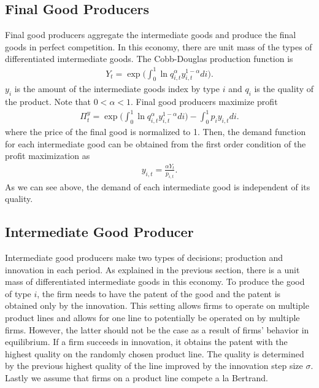 \documentclass[a4paper,12pt]{article}
\begin{document}
\subsection{Final Good Producers}
Final good producers aggregate the intermediate goods and produce the final goods in perfect competition. In this economy, there are unit mass of the types of differentiated imtermediate goods. The Cobb-Douglas production function is
\begin{align}
    Y_t = \exp\bigg(\int_0^1 \ln q_{i,t}^\alpha y_{i,t}^{1-\alpha} di\bigg).
\end{align}
$y_i$ is the amount of the intermediate goods index by type $i$ and $q_i$ is the quality of the product. Note that $0<\alpha<1$. Final good producers maximize profit 
\begin{align}
    \Pi_t^y = \exp\bigg(\int_0^1 \ln q_{i,t}^\alpha y_{i,t}^{1-\alpha} di\bigg) - \int_0^1 p_i y_{i,t} di.
\end{align}
where the price of the final good is normalized to 1. Then, the demand function for each intermediate good can be obtained from the first order condition of the profit maximization as
\begin{align}
    y_{i,t} = \frac{\alpha Y_t}{p_{i,t}}.
\end{align}
As we can see above, the demand of each intermediate good is independent of its quality. 

\subsection{Intermediate Good Producer}
Intermediate good producers make two types of decisions; production and innovation in each period. As explained in the previous section, there is a unit mass of differentiated intermediate goods in this economy. To produce the good of type $i$, the firm needs to have the patent of the good and the patent is obtained only by the innovation. This setting allows firms to operate on multiple product lines and allows for one line to potentially be operated on by multiple firms. However, the latter should not be the case as a result of firms' behavior in equilibrium. If a firm succeeds in innovation, it obtains the patent with the highest quality on the randomly chosen product line. The quality is determined by the previous highest quality of the line improved by the innovation step size $\sigma$. Lastly we assume that firms on a product line compete a la Bertrand. 
\end{document}

